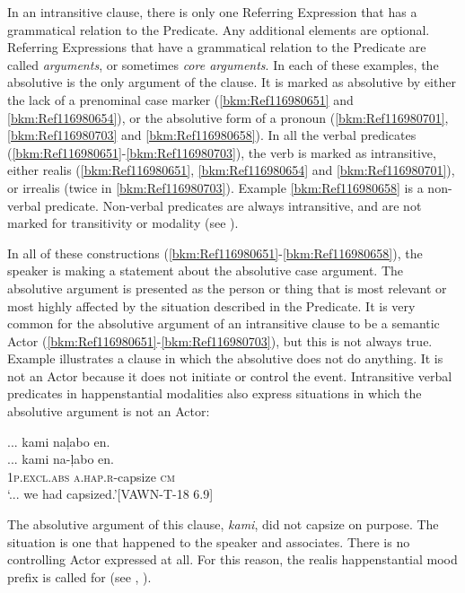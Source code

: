 In an intransitive clause, there is only one Referring Expression that has a grammatical relation to the Predicate. Any additional elements are optional. Referring Expressions that have a grammatical relation to the Predicate are called \textit{arguments}, or sometimes \textit{core arguments}. In each of these examples, the absolutive is the only argument of the clause. It is marked as absolutive by either the lack of a prenominal case marker (\ref{bkm:Ref116980651} and \ref{bkm:Ref116980654}), or the absolutive form of a pronoun (\ref{bkm:Ref116980701}, \ref{bkm:Ref116980703} and \ref{bkm:Ref116980658}). In all the verbal predicates (\ref{bkm:Ref116980651}-\ref{bkm:Ref116980703}), the verb is marked as intransitive, either realis (\ref{bkm:Ref116980651}, \ref{bkm:Ref116980654} and \ref{bkm:Ref116980701}), or irrealis (twice in \ref{bkm:Ref116980703}). Example \ref{bkm:Ref116980658} is a non-verbal predicate. Non-verbal predicates are always intransitive, and are not marked for transitivity or modality (see ).

In all of these constructions (\ref{bkm:Ref116980651}-\ref{bkm:Ref116980658}), the speaker is making a statement about the absolutive case argument. The absolutive argument is presented as the person or thing that is most relevant or most highly affected by the situation described in the Predicate. It is very common for the absolutive argument of an intransitive clause to be a semantic Actor (\ref{bkm:Ref116980651}-\ref{bkm:Ref116980703}), but this is not always true. Example  illustrates a clause in which the absolutive does not do anything. It is not an Actor because it does not initiate or control the event. Intransitive verbal predicates in happenstantial modalities also express situations in which the absolutive argument is not an Actor:

\ea
...   kami  naļabo  en. \\\smallskip
\gll ...   kami  na-ļabo  en. \\
{} 1\textsc{p.excl.abs}  \textsc{a.hap.r}-capsize  \textsc{cm} \\
\glt ‘... we had capsized.’[VAWN-T-18 6.9]
\z

The absolutive argument of this clause, \textit{kami}, did not capsize on purpose. The situation is one that happened to the speaker and associates. There is no controlling Actor expressed at all. For this reason, the realis happenstantial mood prefix is called for (see , ).

